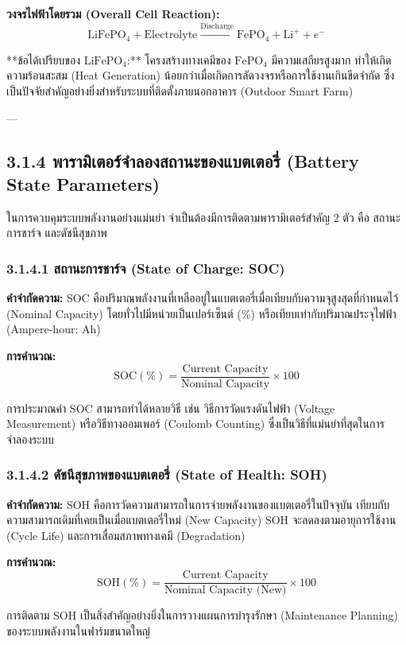 \documentclass[11pt,a4paper,openany]{report}
\begin{document}
\textbf{วงจรไฟฟ้าโดยรวม (Overall Cell Reaction):}
$$\text{LiFePO}_4 + \text{Electrolyte} \xrightarrow{\text{Discharge}} \text{FePO}_4 + \text{Li}^+ + e^-$$


**ข้อได้เปรียบของ $\text{LiFePO}_4$:** โครงสร้างทางเคมีของ $\text{FePO}_4$ มีความเสถียรสูงมาก ทำให้เกิดความร้อนสะสม (Heat Generation) น้อยกว่าเมื่อเกิดการลัดวงจรหรือการใช้งานเกินขีดจำกัด ซึ่งเป็นปัจจัยสำคัญอย่างยิ่งสำหรับระบบที่ติดตั้งภายนอกอาคาร (Outdoor Smart Farm)

---

\subsection{3.1.4 พารามิเตอร์จำลองสถานะของแบตเตอรี่ (Battery State Parameters)}


ในการควบคุมระบบพลังงานอย่างแม่นยำ จำเป็นต้องมีการติดตามพารามิเตอร์สำคัญ 2 ตัว คือ สถานะการชาร์จ และดัชนีสุขภาพ

\subsubsection{3.1.4.1 สถานะการชาร์จ (State of Charge: SOC)}


\textbf{คำจำกัดความ:} SOC คือปริมาณพลังงานที่เหลืออยู่ในแบตเตอรี่เมื่อเทียบกับความจุสูงสุดที่กำหนดไว้ (Nominal Capacity) โดยทั่วไปมีหน่วยเป็นเปอร์เซ็นต์ ($\%$) หรือเทียบเท่ากับปริมาณประจุไฟฟ้า (Ampere-hour: $\text{Ah}$)

\textbf{การคำนวณ:}
$$\text{SOC} (\%) = \frac{\text{Current Capacity}}{\text{Nominal Capacity}} \times 100$$


การประมาณค่า SOC สามารถทำได้หลายวิธี เช่น วิธีการวัดแรงดันไฟฟ้า (Voltage Measurement) หรือวิธีทางออมเพอร์ (Coulomb Counting) ซึ่งเป็นวิธีที่แม่นยำที่สุดในการจำลองระบบ

\subsubsection{3.1.4.2 ดัชนีสุขภาพของแบตเตอรี่ (State of Health: SOH)}


\textbf{คำจำกัดความ:} SOH คือการวัดความสามารถในการจ่ายพลังงานของแบตเตอรี่ในปัจจุบัน เทียบกับความสามารถเดิมที่เคยเป็นเมื่อแบตเตอรี่ใหม่ (New Capacity) SOH จะลดลงตามอายุการใช้งาน (Cycle Life) และการเสื่อมสภาพทางเคมี (Degradation)

\textbf{การคำนวณ:}
$$\text{SOH} (\%) = \frac{\text{Current Capacity}}{\text{Nominal Capacity (New)}} \times 100$$


การติดตาม SOH เป็นสิ่งสำคัญอย่างยิ่งในการวางแผนการบำรุงรักษา (Maintenance Planning) ของระบบพลังงานในฟาร์มขนาดใหญ่
\end{document}
